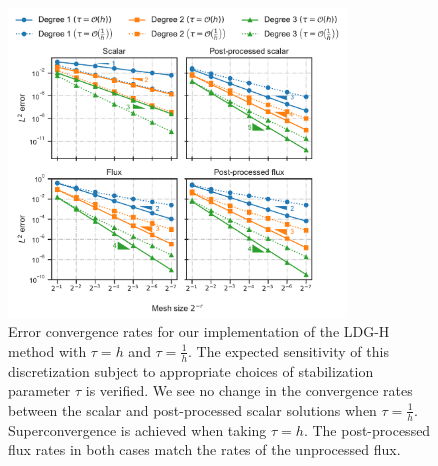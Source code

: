 \documentclass[a4paper]{article}
\begin{document}
\begin{figure}[!htbp]
	\centering
	\includegraphics[width=0.8\textwidth]{LDGH/LDGH-convergence}
	\caption{Error convergence rates for our implementation of the LDG-H method with
		$\tau = h$ and $\tau = \frac{1}{h}$.
		The expected sensitivity of this discretization subject to appropriate choices of
		stabilization parameter $\tau$ is verified. We see no change in the convergence
		rates between the scalar and post-processed scalar solutions when $\tau = \frac{1}{h}$.
		Superconvergence is achieved when taking $\tau = h$. The post-processed flux rates in both
		cases match the rates of the unprocessed flux.}
	\label{fig:ldgh-conv}
\end{figure}
\end{document}
